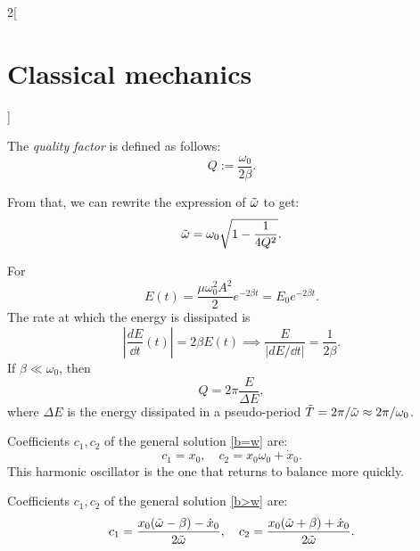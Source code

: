 \documentclass[../../../main.tex]{subfiles}
\begin{document}
\begin{multicols}{2}[\section{Classical mechanics}]
\begin{prop}
    \end{prop}
    \begin{definition}
        The \textit{quality factor} is defined as follows: $$Q:=\frac{\omega_0}{2\beta}.$$
    \end{definition}
    \noindent From that, we can rewrite the expression of $\Tilde{\omega}$ to get: $$\Tilde{\omega}=\omega_0\sqrt{1-\frac{1}{4Q^2}}.$$
    \begin{prop}
        For
        $$E(t)=\frac{\mu\omega_0^2A^2}{2}e^{-2\beta t}=E_0e^{-2\beta t}.$$ The rate at which the energy is dissipated is $$\left|\frac{dE}{\dd t}(t)\right|=2\beta E(t)\implies\frac{E}{\left|dE/\dd t\right|}=\frac{1}{2\beta}.$$
        If $\beta\ll\omega_0$, then $$Q=2\pi\frac{E}{\Delta E},$$ where $\Delta E$ is the energy dissipated in a pseudo-period $\Tilde{T}=2\pi/\Tilde{\omega}\approx2\pi/\omega_0$.
    \end{prop}
    \begin{prop}[Critically damped harmonic oscillator: $\beta=\omega_0$]
        Coefficients $c_1,c_2$ of the general solution \eqref{b=w} are: $$c_1=x_0,\quad c_2=x_0\omega_0+\dot{x}_0.$$ This harmonic oscillator is the one that returns to balance more quickly.
    \end{prop}
    \begin{prop}
        Coefficients $c_1,c_2$ of the general solution \eqref{b>w} are: $$c_1=\frac{x_0(\Tilde{\omega}-\beta)-\dot{x}_0}{2\Tilde{\omega}},\quad c_2=\frac{x_0(\Tilde{\omega}+\beta)+\dot{x}_0}{2\Tilde{\omega}}.$$
    \end{prop}

\end{multicols}
\end{document}
